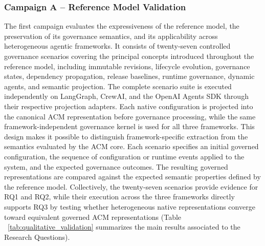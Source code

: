 \documentclass[10pt]{article}
\begin{document}
\subsubsection{Campaign A -- Reference Model Validation} The first campaign evaluates the expressiveness of the reference model, the preservation of its governance semantics, and its applicability across heterogeneous agentic frameworks. It consists of twenty-seven controlled governance scenarios covering the principal concepts introduced throughout the reference model, including immutable revisions, lifecycle evolution, governance states, dependency propagation, release baselines, runtime governance, dynamic agents, and semantic projection. The complete scenario suite is executed independently on LangGraph, CrewAI, and the OpenAI Agents SDK through their respective projection adapters. Each native configuration is projected into the canonical ACM representation before governance processing, while the same framework-independent governance kernel is used for all three frameworks. This design makes it possible to distinguish framework-specific extraction from the semantics evaluated by the ACM core. Each scenario specifies an initial governed configuration, the sequence of configuration or runtime events applied to the system, and the expected governance outcomes. The resulting governed representations are compared against the expected semantic properties defined by the reference model. Collectively, the twenty-seven scenarios provide evidence for RQ1 and RQ2, while their execution across the three frameworks directly supports RQ3 by testing whether heterogeneous native representations converge toward equivalent governed ACM representations (Table ~\ref{tab:qualitative_validation} summarizes the main results associated to the Research Questions). 
\end{document}
